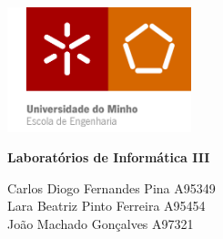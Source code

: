 \documentclass[11pt]{article}
\begin{document}
\begin{titlepage}
    \begin{center}
        \includegraphics[width=0.4\textwidth]{Imagens/uni.png}
    
        \vspace{2cm}
        
        \textbf{\Huge Laboratórios de Informática III}\par

        \vspace{3cm}
        
        \large 
        
        Carlos Diogo Fernandes Pina A95349 \\
        Lara Beatriz Pinto Ferreira A95454 \\ 
        João Machado Gonçalves A97321 \\

        \vspace{2cm}
    

\end{center}
\end{titlepage}
\end{document}

